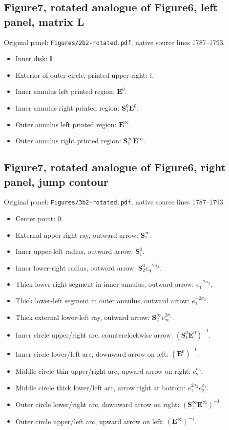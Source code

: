 \documentclass[11pt]{article}
\numberwithin{equation}{section}
\numberwithin{equation}{section}
\begin{document}
\subsection*{Figure7, rotated analogue of Figure6, left panel, matrix L}
\noindent Original panel: \texttt{Figures/2b2-rotated.pdf}, native source lines 1787--1793.
\begin{itemize}\itemsep=0pt
\item Inner disk: $\mathbb{I}$.
\item Exterior of outer circle, printed upper-right: $\mathbb{I}$.
\item Inner annulus left printed region: $\mathbf{E}^0{}$.
\item Inner annulus right printed region: $\mathbf{S}_1^0{}\mathbf{E}^0{}$.
\item Outer annulus left printed region: $\mathbf{E}^\infty{}$.
\item Outer annulus right printed region: $\mathbf{S}_1^\infty{}\mathbf{E}^\infty{}$.
\end{itemize}

\subsection*{Figure7, rotated analogue of Figure6, right panel, jump contour}
\noindent Original panel: \texttt{Figures/3b2-rotated.pdf}, native source lines 1787--1793.
\begin{itemize}\itemsep=0pt
\item Center point: $0$.
\item External upper-right ray, outward arrow: $\mathbf{S}_1^\infty{}$.
\item Inner upper-left radius, outward arrow: $\mathbf{S}_1^0{}$.
\item Inner lower-right radius, outward arrow: $\mathbf{S}_2^0{}e_0^{-2\sigma_3}$.
\item Thick lower-right segment in inner annulus, outward arrow: $e_1^{-2\sigma_3}$.
\item Thick lower-left segment in outer annulus, outward arrow: $e_1^{-2\sigma_3}$.
\item Thick external lower-left ray, outward arrow: $\mathbf{S}_2^\infty{}e_\infty^{2\sigma_3}$.
\item Inner circle upper/right arc, counterclockwise arrow: $(\mathbf{S}_1^0{}\mathbf{E}^0{})^{-1}$.
\item Inner circle lower/left arc, downward arrow on left: $(\mathbf{E}^0{})^{-1}$.
\item Middle circle thin upper/right arc, upward arrow on right: $e_2^{\sigma_3}$.
\item Middle circle thick lower/left arc, arrow right at bottom: $e_1^{2\sigma_3}e_2^{\sigma_3}$.
\item Outer circle lower/right arc, downward arrow on right: $(\mathbf{S}_1^\infty{}\mathbf{E}^\infty{})^{-1}$.
\item Outer circle upper/left arc, upward arrow on left: $(\mathbf{E}^\infty{})^{-1}$.
\end{itemize}
\end{document}

